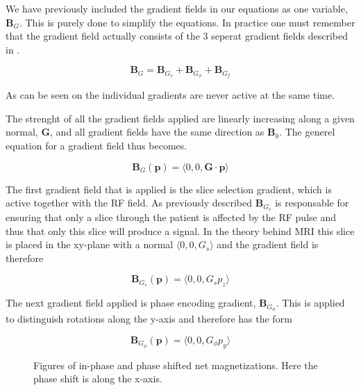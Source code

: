We have previously included the gradient fields in our equations as
one variable, $\mathbf{B}_G$. This is purely done to simplify the
equations. In practice one must remember that the gradient field
actually consists of the 3 seperat gradient fields described in
.

\begin{displaymath}
  \mathbf{B}_G = \mathbf{B}_{G_s} + \mathbf{B}_{G_\phi} + \mathbf{B}_{G_f}
\end{displaymath}

As can be seen on  the individual
gradients are never active at the same time.

The strenght of all the gradient fields applied are linearly
increasing along a given normal, $\mathbf{G}$, and all gradient fields
have the same direction as $\mathbf{B}_0$. The generel equation for a
gradient field thus becomes.

\begin{displaymath}
  \mathbf{B}_G(\mathbf{p}) = \langle 0, 0, \mathbf{G} \cdot \mathbf{p} \rangle
\end{displaymath}


The first gradient field that is applied is the slice selection
gradient, which is active together with the RF field. As previously
described $\mathbf{B}_{G_s}$ is responsable for ensuring that only a
slice through the patient is affected by the RF pulse and thus that
only this slice will produce a signal. In the theory behind MRI this
slice is placed in the xy-plane with a normal $\langle 0, 0, G_s
\rangle$ and the gradient field is therefore

\begin{displaymath}
  \mathbf{B}_{G_s}(\mathbf{p}) = \langle 0, 0, G_s p_z \rangle
\end{displaymath}



The next gradient field applied is phase encoding gradient,
$\mathbf{B}_{G_\phi}$. This is applied to distinguish rotations along
the y-axis and therefore has the form

\begin{displaymath}
  \mathbf{B}_{G_\phi}(\mathbf{p}) = \langle 0, 0, G_\phi p_y \rangle
\end{displaymath}

\begin{figure}
  \centering
  \caption{Figures of in-phase and phase shifted net
    magnetizations. Here the phase shift is along the x-axis.}
  \label{fig:phaseShift}
\end{figure}

